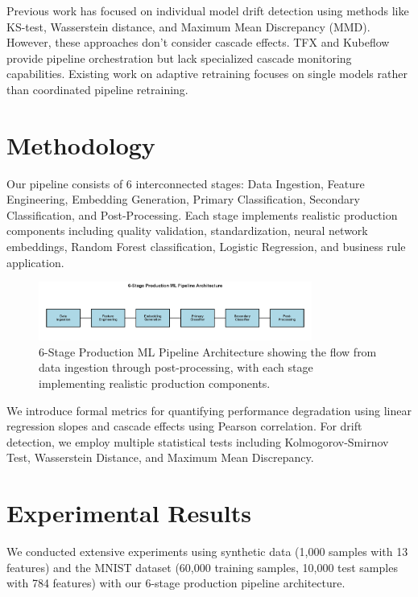 \documentclass{article}
\begin{document}
Previous work has focused on individual model drift detection using methods like KS-test, Wasserstein distance, and Maximum Mean Discrepancy (MMD). However, these approaches don't consider cascade effects. TFX and Kubeflow provide pipeline orchestration but lack specialized cascade monitoring capabilities. Existing work on adaptive retraining focuses on single models rather than coordinated pipeline retraining.


\section{Methodology}

Our pipeline consists of 6 interconnected stages: Data Ingestion, Feature Engineering, Embedding Generation, Primary Classification, Secondary Classification, and Post-Processing. Each stage implements realistic production components including quality validation, standardization, neural network embeddings, Random Forest classification, Logistic Regression, and business rule application.

\begin{figure}[h]
\centering
\includegraphics[width=0.8\textwidth]{media/pipeline_architecture.png}
\caption{6-Stage Production ML Pipeline Architecture showing the flow from data ingestion through post-processing, with each stage implementing realistic production components.}
\label{fig:pipeline_architecture}
\end{figure}

We introduce formal metrics for quantifying performance degradation using linear regression slopes and cascade effects using Pearson correlation. For drift detection, we employ multiple statistical tests including Kolmogorov-Smirnov Test, Wasserstein Distance, and Maximum Mean Discrepancy.

\section{Experimental Results}

We conducted extensive experiments using synthetic data (1,000 samples with 13 features) and the MNIST dataset (60,000 training samples, 10,000 test samples with 784 features) with our 6-stage production pipeline architecture.
\end{document}
